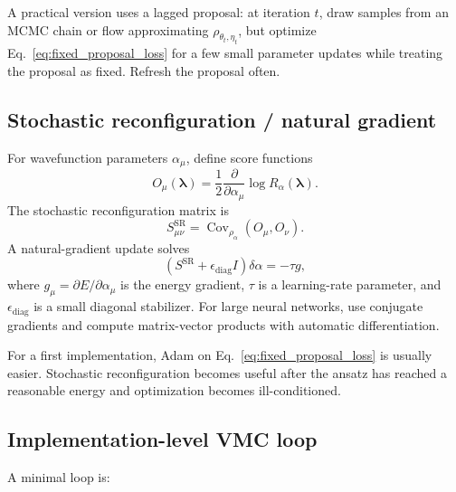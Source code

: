 \documentclass[11pt]{article}
\newcommand{\Cov}{\operatorname{Cov}}
\begin{document}
A practical version uses a lagged proposal: at iteration $t$, draw samples from an MCMC chain or flow approximating $\rho_{\theta_t,\eta_t}$, but optimize Eq.~\eqref{eq:fixed_proposal_loss} for a few small parameter updates while treating the proposal as fixed.  Refresh the proposal often.

\subsection{Stochastic reconfiguration / natural gradient}

For wavefunction parameters $\alpha_\mu$, define score functions
\begin{equation}
O_\mu(\bm\lambda)
=\frac12\frac{\partial}{\partial\alpha_\mu}\log R_{\alpha}(\bm\lambda).
\end{equation}
The stochastic reconfiguration matrix is
\begin{equation}
S_{\mu\nu}^{\mathrm{SR}}
=\Cov_{\rho_\alpha}(O_\mu,O_\nu).
\end{equation}
A natural-gradient update solves
\begin{equation}
\left(S^{\mathrm{SR}}+\epsilon_{\mathrm{diag}}I\right)\delta\alpha=-\tau g,
\end{equation}
where $g_\mu=\partial E/\partial\alpha_\mu$ is the energy gradient, $\tau$ is a learning-rate parameter, and $\epsilon_{\mathrm{diag}}$ is a small diagonal stabilizer.  For large neural networks, use conjugate gradients and compute matrix-vector products with automatic differentiation.

For a first implementation, Adam on Eq.~\eqref{eq:fixed_proposal_loss} is usually easier.  Stochastic reconfiguration becomes useful after the ansatz has reached a reasonable energy and optimization becomes ill-conditioned.

\subsection{Implementation-level VMC loop}

A minimal loop is:
\end{document}
